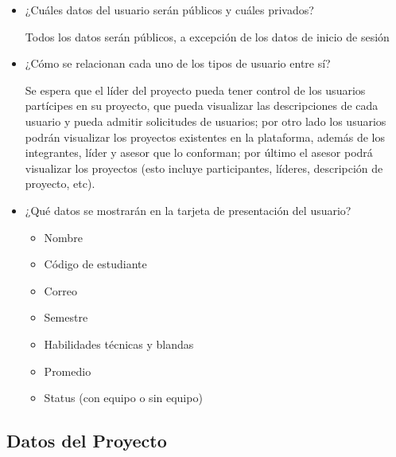 \begin{itemize}
		\item ¿Cuáles datos del usuario serán públicos y cuáles privados?

			Todos los datos serán públicos, a excepción de los datos de inicio de sesión

		\item ¿Cómo se relacionan cada uno de los tipos de usuario entre sí?

			Se espera que el líder del proyecto pueda tener control de los usuarios partícipes
			en su proyecto, que pueda visualizar las descripciones de cada usuario y
			pueda admitir solicitudes de usuarios; por otro lado los usuarios podrán visualizar
			los proyectos existentes en la plataforma, además de los integrantes, líder y
			asesor que lo conforman; por último el asesor podrá visualizar los proyectos
			(esto incluye participantes, líderes, descripción de proyecto, etc).

		\item ¿Qué datos se mostrarán en la tarjeta de presentación del usuario?

			\begin{itemize}
				\item Nombre

				\item Código de estudiante

				\item Correo

				\item Semestre

				\item Habilidades técnicas y blandas

				\item Promedio

				\item Status (con equipo o sin equipo)
			\end{itemize}
	\end{itemize}

	\subsection{Datos del Proyecto}

